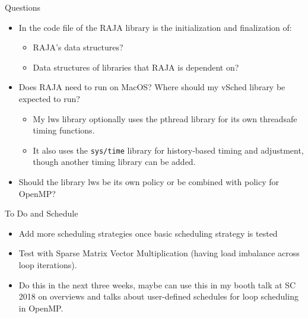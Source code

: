 \documentclass{beamer}
\begin{document}
\begin{frame}{Questions} 
\begin{itemize}
\item In the code file of the RAJA library is the initialization and finalization of:
\begin{itemize} 
\item RAJA's data structures?
\item Data structures of libraries that RAJA is dependent on?
\end{itemize} 
\item Does RAJA need to run on MacOS? Where should my vSched library
  be expected to run? 
\begin{itemize} 
\small \item \small My lws library optionally uses the pthread library for its own threadsafe timing functions. 
\item \small It also uses the {\tt sys/time} library for history-based timing
  and adjustment, though another timing library can be added. 
\end{itemize} 
\item Should the library lws be its own policy or be combined with
  policy for OpenMP? 
\end{itemize}
\end{frame}

\begin{frame}{To Do and Schedule}
\begin{itemize}
\item Add more scheduling strategies once basic scheduling strategy is tested
\item Test with Sparse Matrix Vector Multiplication (having load imbalance across loop iterations).
\item Do this in the next three weeks, maybe can use this in my booth talk at SC 2018 on overviews and talks about user-defined schedules for loop scheduling in OpenMP.
\end{itemize}
\end{frame}
\end{document}
